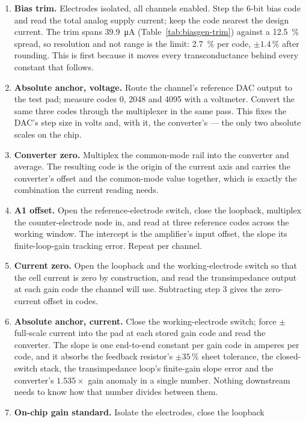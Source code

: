 \begin{enumerate}[leftmargin=*, itemsep=2pt]
\item \textbf{Bias trim.} Electrodes isolated, all channels enabled. Step the
  6-bit bias code and read the total analog supply current; keep the code
  nearest the design current. The trim spans \SI{39.9}{\micro\ampere}
  (Table~\ref{tab:biasgen-trim}) against a \SI{12.5}{\percent} spread, so
  resolution and not range is the limit: \SI{2.7}{\percent} per code,
  \(\pm1.4\,\%\) after rounding. This is first because it moves every
  transconductance behind every constant that follows.
\item \textbf{Absolute anchor, voltage.} Route the channel's reference DAC
  output to the test pad; measure codes 0, 2048 and 4095 with a voltmeter.
  Convert the same three codes through the multiplexer in the same pass. This
  fixes the DAC's step size in volts and, with it, the converter's --- the only
  two absolute scales on the chip.
\item \textbf{Converter zero.} Multiplex the common-mode rail into the
  converter and average. The resulting code is the origin of the current axis
  and carries the converter's offset and the common-mode value together, which
  is exactly the combination the current reading needs.
\item \textbf{A1 offset.} Open the reference-electrode switch, close the
  loopback, multiplex the counter-electrode node in, and read at three
  reference codes across the working window. The intercept is the amplifier's
  input offset, the slope its finite-loop-gain tracking error. Repeat per
  channel.
\item \textbf{Current zero.} Open the loopback and the working-electrode switch
  so that the cell current is zero by construction, and read the transimpedance
  output at each gain code the channel will use. Subtracting step 3 gives the
  zero-current offset in codes.
\item \textbf{Absolute anchor, current.} Close the working-electrode switch;
  force \(\pm\) full-scale current into the pad at each stored gain code and
  read the converter. The slope is one end-to-end constant per gain code in
  amperes per code, and it absorbs the feedback resistor's \(\pm35\,\%\) sheet
  tolerance, the closed-switch stack, the transimpedance loop's finite-gain
  slope error and the converter's \(1.535\times\) gain anomaly in a single
  number. Nothing downstream needs to know how that number divides between them.
\item \textbf{On-chip gain standard.} Isolate the electrodes, close the loopback

\end{enumerate}
